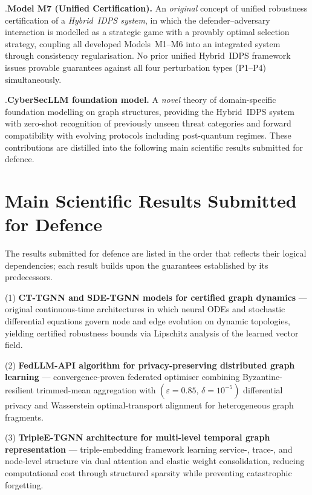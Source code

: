 .\quad \textbf{Model M7 (Unified Certification).} An
\emph{original} concept of unified robustness certification of a
\emph{Hybrid~IDPS system}, in which the defender--adversary
interaction is modelled as a strategic game with a provably
optimal selection strategy, coupling all developed
Models~M1--M6 into an integrated system through consistency
regularisation. No prior unified Hybrid~IDPS framework issues
provable guarantees against all four perturbation types
(P1--P4) simultaneously.

.\quad \textbf{CyberSecLLM foundation model.} A \emph{novel}
theory of domain-specific foundation modelling on graph
structures, providing the Hybrid~IDPS system with zero-shot
recognition of previously unseen threat categories and forward
compatibility with evolving protocols including post-quantum
regimes. These contributions are distilled into the following
main scientific results submitted for defence.

\section*{Main Scientific Results Submitted for Defence}

The results submitted for defence are listed in the order that reflects their logical dependencies; each result builds upon the guarantees established by its predecessors.

(1) \textbf{CT-TGNN and SDE-TGNN models for certified graph dynamics} --- original continuous-time architectures in which neural ODEs and stochastic differential equations govern node and edge evolution on dynamic topologies, yielding certified robustness bounds via Lipschitz analysis of the learned vector field.

(2) \textbf{FedLLM-API algorithm for privacy-preserving distributed graph learning} --- convergence-proven federated optimiser combining Byzantine-resilient trimmed-mean aggregation with $(\varepsilon{=}0.85,\,\delta{=}10^{-5})$ differential privacy and Wasserstein optimal-transport alignment for heterogeneous graph fragments.

(3) \textbf{TripleE-TGNN architecture for multi-level temporal graph representation} --- triple-embedding framework learning service-, trace-, and node-level structure via dual attention and elastic weight consolidation, reducing computational cost through structured sparsity while preventing catastrophic forgetting.

